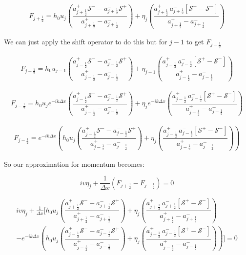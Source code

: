 \documentclass[12pt]{article}
\begin{document}
\begin{gather}
F_{j+\frac{1}{2}} = h_0u_j \left(\dfrac{a^+_{j+\frac{1}{2}} \mathcal{S^-} - a^-_{j+\frac{1}{2}} \mathcal{S^+} }{a^+_{j+\frac{1}{2}} - a^-_{j+\frac{1}{2}}}\right)   + \eta_{j}  \left(\dfrac{a^+_{j+\frac{1}{2}} \, a^-_{j+\frac{1}{2}}\left [ \mathcal{S^+} -\mathcal{S^-} \right ] }{a^+_{j+\frac{1}{2}} - a^-_{j+\frac{1}{2}}}\right) 
\end{gather}

We can just apply the shift operator to do this but for $j-1$ to get $F_{j-\frac{1}{2}}$

\begin{gather}
F_{j-\frac{1}{2}} = h_0u_{j-1} \left(\dfrac{a^+_{j-\frac{1}{2}} \mathcal{S^-} - a^-_{j-\frac{1}{2}} \mathcal{S^+} }{a^+_{j-\frac{1}{2}} - a^-_{j-\frac{1}{2}}}\right)   + \eta_{j-1}  \left(\dfrac{a^+_{j-\frac{1}{2}} \, a^-_{j-\frac{1}{2}}\left [ \mathcal{S^+} -\mathcal{S^-} \right ] }{a^+_{j-\frac{1}{2}} - a^-_{j-\frac{1}{2}}}\right) 
\end{gather}

\begin{gather}
F_{j-\frac{1}{2}} = h_0u_{j}e^{-ik\Delta x} \left(\dfrac{a^+_{j-\frac{1}{2}} \mathcal{S^-} - a^-_{j-\frac{1}{2}} \mathcal{S^+} }{a^+_{j-\frac{1}{2}} - a^-_{j-\frac{1}{2}}}\right)   + \eta_{j}e^{-ik\Delta x}  \left(\dfrac{a^+_{j-\frac{1}{2}} \, a^-_{j-\frac{1}{2}}\left [ \mathcal{S^+} -\mathcal{S^-} \right ] }{a^+_{j-\frac{1}{2}} - a^-_{j-\frac{1}{2}}}\right) 
\end{gather}

\begin{gather}
F_{j-\frac{1}{2}} = e^{-ik\Delta x}\left(h_0u_{j} \left(\dfrac{a^+_{j-\frac{1}{2}} \mathcal{S^-} - a^-_{j-\frac{1}{2}} \mathcal{S^+} }{a^+_{j-\frac{1}{2}} - a^-_{j-\frac{1}{2}}}\right)   + \eta_{j} \left(\dfrac{a^+_{j-\frac{1}{2}} \, a^-_{j-\frac{1}{2}}\left [ \mathcal{S^+} -\mathcal{S^-} \right ] }{a^+_{j-\frac{1}{2}} - a^-_{j-\frac{1}{2}}}\right)\right) 
\end{gather}

So our approximation for momentum becomes:

\[iv\eta_j + \frac{1}{\Delta x} \left( F_{j+\frac{1}{2}} - F_{j-\frac{1}{2}} \right) = 0\]

\begin{multline}
iv\eta_j + \frac{1}{\Delta x} [ h_0u_j \left(\dfrac{a^+_{j+\frac{1}{2}} \mathcal{S^-} - a^-_{j+\frac{1}{2}} \mathcal{S^+} }{a^+_{j+\frac{1}{2}} - a^-_{j+\frac{1}{2}}}\right)   + \eta_{j}  \left(\dfrac{a^+_{j+\frac{1}{2}} \, a^-_{j+\frac{1}{2}}\left [ \mathcal{S^+} -\mathcal{S^-} \right ] }{a^+_{j+\frac{1}{2}} - a^-_{j+\frac{1}{2}}}\right) \\- e^{-ik\Delta x}\left(h_0u_{j} \left(\dfrac{a^+_{j-\frac{1}{2}} \mathcal{S^-} - a^-_{j-\frac{1}{2}} \mathcal{S^+} }{a^+_{j-\frac{1}{2}} - a^-_{j-\frac{1}{2}}}\right)   + \eta_{j} \left(\dfrac{a^+_{j-\frac{1}{2}} \, a^-_{j-\frac{1}{2}}\left [ \mathcal{S^+} -\mathcal{S^-} \right ] }{a^+_{j-\frac{1}{2}} - a^-_{j-\frac{1}{2}}}\right)\right) ] = 0
\end{multline}
\end{document}
